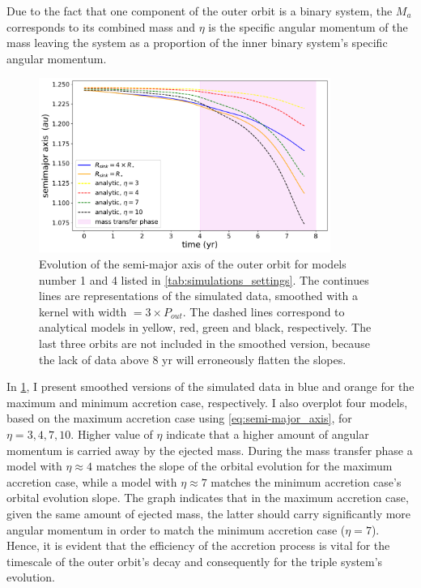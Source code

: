 Due to the fact that one component of the outer orbit is a binary system, the $M_a$ corresponds to its combined mass and $\eta$ is the specific angular momentum of the mass leaving the system as a proportion of the inner binary system's specific angular momentum. 
\begin{figure}[!htb]
    \centering
    \includegraphics[width=0.85\textwidth]{Thesis/graphs/analytical_model.pdf}
    \caption{Evolution of the semi-major axis of the outer orbit for models number 1 and 4 listed in \cref{tab:simulations_settings}. The continues lines are representations of the simulated data, smoothed with a kernel with width $= 3 \times P_{out}$. The dashed lines correspond to analytical models in yellow, red, green and black, respectively.  The last three orbits are not included in the smoothed version, because the lack of data above $8$ yr will erroneously flatten the slopes.}
    \label{fig:comparison_analytical_model_max}
\end{figure}
In \cref{fig:comparison_analytical_model_max}, I present smoothed versions of the simulated data in blue and orange for the maximum and minimum accretion case, respectively. I also overplot four models, based on the maximum accretion case using \cref{eq:semi-major_axis}, for $\eta = 3,4,7,10$. Higher value of $\eta$ indicate that a higher amount of angular momentum is carried away by the ejected mass. During the mass transfer phase a model with $\eta \approx 4$ matches the slope of the orbital evolution for the maximum accretion case, while a model with $\eta \approx 7$ matches the minimum accretion case's orbital evolution slope. The graph indicates that in the maximum accretion case, given the same amount of ejected mass, the latter should carry significantly more angular momentum in order to match the minimum accretion case ($\eta = 7$). Hence, it is evident that the efficiency of the accretion process is vital for the timescale of the outer orbit's decay and consequently for the triple system's evolution.




